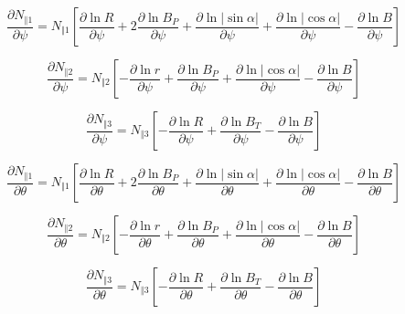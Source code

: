 \documentclass[a4paper,12pt]{article}%
\begin{document}
\begin{equation}
\frac{\partial N_{\Vert1}}{\mathcal{\partial}\psi}=N_{\Vert1}\left[
\frac{\partial\ln R}{\mathcal{\partial}\psi}+2\frac{\partial\ln B_{P}%
}{\mathcal{\partial}\psi}+\frac{\partial\ln\left\vert \sin\alpha\right\vert
}{\mathcal{\partial}\psi}+\frac{\partial\ln\left\vert \cos\alpha\right\vert
}{\mathcal{\partial}\psi}-\frac{\partial\ln B}{\mathcal{\partial}\psi}\right]
\end{equation}
%

\begin{equation}
\frac{\partial N_{\Vert2}}{\mathcal{\partial}\psi}=N_{\Vert2}\left[
-\frac{\partial\ln r}{\mathcal{\partial}\psi}+\frac{\partial\ln B_{P}%
}{\mathcal{\partial}\psi}+\frac{\partial\ln\left\vert \cos\alpha\right\vert
}{\mathcal{\partial}\psi}-\frac{\partial\ln B}{\mathcal{\partial}\psi}\right]
\end{equation}
%

\begin{equation}
\frac{\partial N_{\Vert3}}{\mathcal{\partial}\psi}=N_{\Vert3}\left[
-\frac{\partial\ln R}{\mathcal{\partial}\psi}+\frac{\partial\ln B_{T}%
}{\mathcal{\partial}\psi}-\frac{\partial\ln B}{\mathcal{\partial}\psi}\right]
\end{equation}
%

\begin{equation}
\frac{\partial N_{\Vert1}}{\mathcal{\partial}\theta}=N_{\Vert1}\left[
\frac{\partial\ln R}{\mathcal{\partial}\theta}+2\frac{\partial\ln B_{P}%
}{\mathcal{\partial}\theta}+\frac{\partial\ln\left\vert \sin\alpha\right\vert
}{\mathcal{\partial}\theta}+\frac{\partial\ln\left\vert \cos\alpha\right\vert
}{\mathcal{\partial}\theta}-\frac{\partial\ln B}{\mathcal{\partial}\theta
}\right]
\end{equation}
%

\begin{equation}
\frac{\partial N_{\Vert2}}{\mathcal{\partial}\theta}=N_{\Vert2}\left[
-\frac{\partial\ln r}{\mathcal{\partial}\theta}+\frac{\partial\ln B_{P}%
}{\mathcal{\partial}\theta}+\frac{\partial\ln\left\vert \cos\alpha\right\vert
}{\mathcal{\partial}\theta}-\frac{\partial\ln B}{\mathcal{\partial}\theta
}\right]
\end{equation}
%

\begin{equation}
\frac{\partial N_{\Vert3}}{\mathcal{\partial}\theta}=N_{\Vert3}\left[
-\frac{\partial\ln R}{\mathcal{\partial}\theta}+\frac{\partial\ln B_{T}%
}{\mathcal{\partial}\theta}-\frac{\partial\ln B}{\mathcal{\partial}\theta
}\right]
\end{equation}
%
\end{document}

